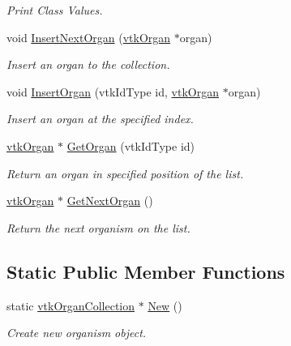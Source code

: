 \begin{DoxyCompactItemize}
\begin{DoxyCompactList}\small\item\em Print Class Values. \item\end{DoxyCompactList}\item 
void \hyperlink{classvtkOrganCollection_abf0d197e67a3d97b38b35a149585a361}{InsertNextOrgan} (\hyperlink{classvtkOrgan}{vtkOrgan} $\ast$organ)
\begin{DoxyCompactList}\small\item\em Insert an organ to the collection. \item\end{DoxyCompactList}\item 
void \hyperlink{classvtkOrganCollection_ab477eb49fdffaa1d077634f9b547fa35}{InsertOrgan} (vtkIdType id, \hyperlink{classvtkOrgan}{vtkOrgan} $\ast$organ)
\begin{DoxyCompactList}\small\item\em Insert an organ at the specified index. \item\end{DoxyCompactList}\item 
\hyperlink{classvtkOrgan}{vtkOrgan} $\ast$ \hyperlink{classvtkOrganCollection_aa5257cc112516992a222c4cdf4e72003}{GetOrgan} (vtkIdType id)
\begin{DoxyCompactList}\small\item\em Return an organ in specified position of the list. \item\end{DoxyCompactList}\item 
\hyperlink{classvtkOrgan}{vtkOrgan} $\ast$ \hyperlink{classvtkOrganCollection_a6c938a8313d037d6f3298b535c09381d}{GetNextOrgan} ()
\begin{DoxyCompactList}\small\item\em Return the next organism on the list. \item\end{DoxyCompactList}\end{DoxyCompactItemize}
\subsection*{Static Public Member Functions}
\begin{DoxyCompactItemize}
\item 
\hypertarget{classvtkOrganCollection_a7037770a0761aabea25278e77036254a}{
static \hyperlink{classvtkOrganCollection}{vtkOrganCollection} $\ast$ \hyperlink{classvtkOrganCollection_a7037770a0761aabea25278e77036254a}{New} ()}
\label{classvtkOrganCollection_a7037770a0761aabea25278e77036254a}

\begin{DoxyCompactList}\small\item\em Create new organism object. \item\end{DoxyCompactList}\end{DoxyCompactItemize}


